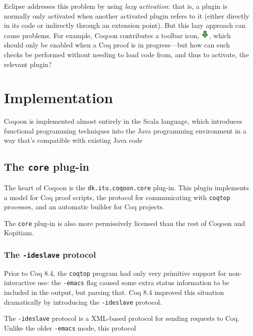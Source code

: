 \documentclass{article}
\newcommand{\fdef}[1]{\textit{#1}}
\begin{document}
Eclipse addresses this problem by using \fdef{lazy activation}: that is,
a plugin is normally only activated when another activated plugin refers to it
(either directly in its code or indirectly through an extension point). But
this lazy approach can cause problems. For example, Coqoon contributes a
toolbar icon, \includegraphics[scale=0.5]{down.png}, which should only be
enabled when a Coq proof is in progress---but how can such checks be performed
without needing to load code from, and thus to activate, the relevant plugin?

\pagebreak

\section{Implementation}

Coqoon is implemented almost entirely in the Scala language, which introduces
functional programming techniques into the Java programming environment in a
way that's compatible with existing Java code

\subsection{The \texttt{core} plug-in}

The heart of Coqoon is the \texttt{dk.itu.coqoon.core} plug-in. This plugin
implements a model for Coq proof scripts, the protocol for communicating with
\texttt{coqtop} processes, and an automatic builder for Coq projects.

The \texttt{core} plug-in is also more permissively licensed than the rest of
Coqoon and Kopitiam.

\subsubsection{The \texttt{-ideslave} protocol}

Prior to Coq 8.4, the \texttt{coqtop} program had only very primitive support
for non-interactive use: the \texttt{-emacs} flag caused some extra status
information to be included in the output, but parsing that. Coq 8.4 improved this situation
dramatically by introducing the \texttt{-ideslave} protocol.

The \texttt{-ideslave} protocol is a XML-based protocol for sending requests
to Coq. Unlike the older \texttt{-emacs} mode, this protocol 
\end{document}
